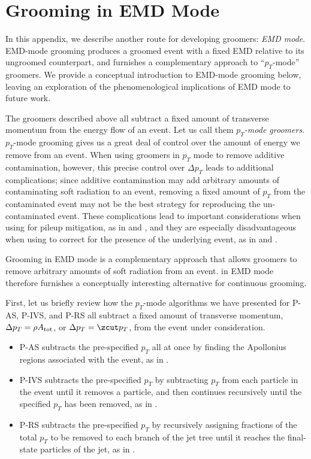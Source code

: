 \appendix


\section{Grooming in EMD Mode}
\label{app:grooming_in_emd_mode}


In this appendix, we describe another route for developing \PIRANHA{} groomers:
%
\textit{EMD mode}.
%
EMD-mode grooming produces a groomed event with a fixed EMD relative to its ungroomed counterpart, and furnishes a complementary approach to ``\(p_T\)-mode'' groomers.
%
We provide a conceptual introduction to EMD-mode grooming below, leaving an exploration of the phenomenological implications of EMD mode to future work.


The \PIRANHA{} groomers described above all subtract a fixed amount of transverse momentum from the energy flow of an event.
%
Let us call them \textit{\(p_T\)-mode groomers}.
%
\(p_T\)-mode grooming gives us a great deal of control over the amount of energy we remove from an event.
%
When using \PIRANHA{} groomers in \(p_T\) mode to remove additive contamination, however, this precise control over \(\Delta p_T\) leads to additional complications;
%
since additive contamination may add arbitrary amounts of contaminating soft radiation to an event, removing a fixed amount of \(p_T\) from the contaminated event may not be the best strategy for reproducing the un-contaminated event.
%
These complications lead to important considerations when using \PIRANHA{} for pileup mitigation, as in  and , and they are especially disadvantageous when using \PIRANHA{} to correct for the presence of the underlying event, as in  and .

Grooming in EMD mode is a complementary approach that allows \PIRANHA{} groomers to remove arbitrary amounts of soft radiation from an event.
%
\PIRANHA{} in EMD mode therefore furnishes a conceptually interesting alternative for continuous grooming.

First, let us briefly review how the \(p_T\)-mode algorithms we have presented for P-AS, P-IVS, and P-RS all subtract a fixed amount of transverse momentum, \(\Delta p_T = \rho A_{\rm tot}\), or \(\Delta p_T = \zcut p_T\), from the event under consideration.
%
\begin{itemize}
\item
P-AS subtracts the pre-specified \(p_T\) all at once by finding the Apollonius regions associated with the event, as in .
%
\item
P-IVS subtracts the pre-specified \(p_T\) by subtracting \(p_T\) from each particle in the event until it removes a particle, and then continues recursively until the specified \(p_T\) has been removed, as in .
%
\item
P-RS subtracts the pre-specified \(p_T\) by recursively assigning fractions of the total \(p_T\) to be removed to each branch of the jet tree until it reaches the final-state particles of the jet, as in .
\end{itemize}



